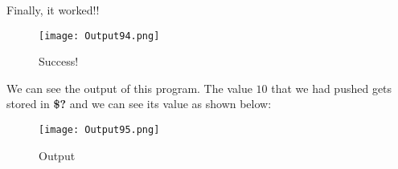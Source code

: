 \documentclass{article}
\begin{document}
Finally, it worked!!
\begin{figure}[h]
	\centering
	\texttt{[image: Output94.png]}
	\caption{Success!}
	\label{fig:fig1}
\end{figure}

We can see the output of this program. The value $10$ that we had pushed gets stored in \textbf{\$?} and we can see its value as shown below:
\begin{figure}[h]
	\centering
	\texttt{[image: Output95.png]}
	\caption{Output}
	\label{fig:fig2}
\end{figure}
\end{document}

